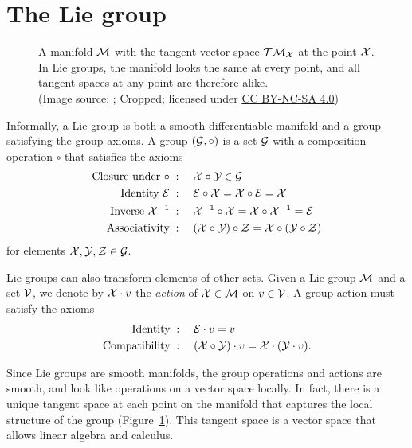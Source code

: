 \section{The Lie group}
\begin{figure}[htb]
    \centering
    \caption{A manifold $\mathcal{M}$ with the tangent vector space $\mathcal{T}\mathcal{M}_{\mathcal{X}}$ at the point $\mathcal{X}$. 
    In Lie groups, the manifold looks the same at every point, and all tangent spaces at any point are therefore alike.\\
    (Image source: \cite{SolaARobotics}; Cropped; licensed under \href{https://creativecommons.org/licenses/by-nc-sa/4.0/}{CC BY-NC-SA 4.0})}
    \label{fig:smooth-manifold}
\end{figure}
%
Informally, a Lie group is both a smooth differentiable manifold and a group satisfying the group axioms.
A group $(\mathcal{G}, \circ)$ is a set $\mathcal{G}$ with a composition operation $\circ$ that satisfies the axioms
\begin{align}
  \text{Closure under $\circ$} \; &: \quad \mathcal{X} \circ \mathcal{Y} \in \mathcal{G}\\
  \text{Identity $\mathcal{E}$} \; &: \quad \mathcal{E} \circ \mathcal{X} = \mathcal{X} \circ \mathcal{E} = \mathcal{X} \label{eq:lie-identity}\\
  \text{Inverse $\mathcal{X}^{-1}$} \; &: \quad \mathcal{X}^{-1} \circ \mathcal{X} = \mathcal{X} \circ \mathcal{X}^{-1} = \mathcal{E}\\
  \text{Associativity} \; &: \quad (\mathcal{X} \circ \mathcal{Y}) \circ \mathcal{Z} = \mathcal{X} \circ (\mathcal{Y} \circ \mathcal{Z})
\end{align}
for elements $\mathcal{X}, \mathcal{Y}, \mathcal{Z} \in \mathcal{G}$.

Lie groups can also transform elements of other sets.
Given a Lie group $\mathcal{M}$ and a set $\mathcal{V}$, we denote by $\mathcal{X} \cdot v$ the \emph{action} of $\mathcal{X} \in \mathcal{M}$ on $v \in \mathcal{V}$.
A group action must satisfy the axioms
\begin{align}
  \text{Identity} \; &: \quad \mathcal{E} \cdot v = v\\
  \text{Compatibility} \; &: \quad (\mathcal{X} \circ \mathcal{Y}) \cdot v = \mathcal{X} \cdot (\mathcal{Y} \cdot v).
\end{align}

Since Lie groups are smooth manifolds, the group operations and actions are smooth, and look like operations on a vector space locally.
In fact, there is a unique tangent space at each point on the manifold that captures the local structure of the group (Figure~\ref{fig:smooth-manifold}).
This tangent space is a vector space that allows linear algebra and calculus.

